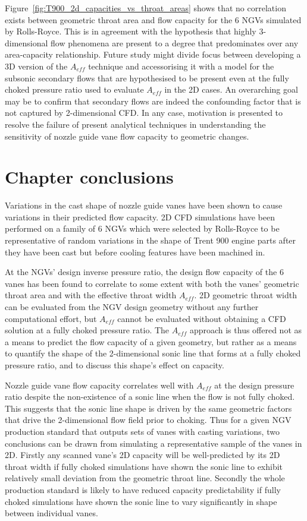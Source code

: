 \documentclass[a4paper, 11pt, oneside]{report}
\begin{document}
Figure~\ref{fig:T900_2d_capacities_vs_throat_areas} shows that no correlation exists between geometric throat area and flow capacity for the 6 NGVs simulated by Rolls-Royce. This is in agreement with the hypothesis that highly 3-dimensional flow phenomena are present to a degree that predominates over any area-capacity relationship. Future study might divide focus between developing a 3D version of the $A_{eff}$ technique and accessorising it with a model for the subsonic secondary flows that are hypothesised to be present even at the fully choked pressure ratio used to evaluate $A_{eff}$ in the 2D cases. An overarching goal may be to confirm that secondary flows are indeed the confounding factor that is not captured by 2-dimensional CFD. In any case, motivation is presented to resolve the failure of present analytical techniques in understanding the sensitivity of nozzle guide vane flow capacity to geometric changes.


\section{Chapter conclusions}

Variations in the cast shape of nozzle guide vanes have been shown to cause variations in their predicted flow capacity. 2D CFD simulations have been performed on a family of 6 NGVs which were selected by Rolls-Royce to be representative of random variations in the shape of Trent 900 engine parts after they have been cast but before cooling features have been machined in. 

At the NGVs' design inverse pressure ratio, the design flow capacity of the 6 vanes has been found to correlate to some extent with both the vanes' geometric throat area and with the effective throat width $A_{eff}$. 2D geometric throat width can be evaluated from the NGV design geometry without any further computational effort, but $A_{eff}$ cannot be evaluated without obtaining a CFD solution at a fully choked pressure ratio. The $A_{eff}$ approach is thus offered not as a means to predict the flow capacity of a given geometry, but rather as a means to quantify the shape of the 2-dimensional sonic line that forms at a fully choked pressure ratio, and to discuss this shape's effect on capacity.

Nozzle guide vane flow capacity correlates well with $A_{eff}$ at the design pressure ratio despite the non-existence of a sonic line when the flow is not fully choked. This suggests that the sonic line shape is driven by the same geometric factors that drive the 2-dimensional flow field prior to choking. Thus for a given NGV production standard that outputs sets of vanes with casting variations, two conclusions can be drawn from simulating a representative sample of the vanes in 2D. Firstly any scanned vane's 2D capacity will be well-predicted by its 2D throat width if fully choked simulations have shown the sonic line to exhibit relatively small deviation from the geometric throat line. Secondly the whole production standard is likely to have reduced capacity predictability if fully choked simulations have shown the sonic line to vary significantly in shape between individual vanes.
\end{document}
